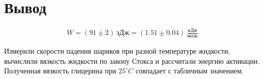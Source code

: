 \documentclass[a4paper, 12pt]{article}
\begin{document}
    \section{Вывод}

    \begin{align*}
        W = (91 \pm 2)~зДж = (1.51 \pm 0.04)~\frac{кДж}{моль}
    \end{align*}

    Измерили скорости падения шариков при разной температуре жидкости, вычислили вязкость жидкости по закону Стокса и рассчитали энергию активации. Полученная вязкость глицерина при $25^\circ C$ совпадает с табличным значением.
\end{document}
